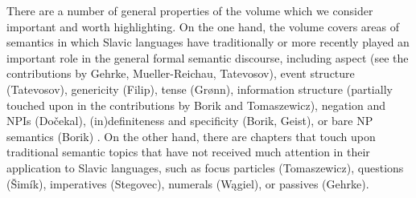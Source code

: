 \documentclass[output=paper,colorlinks,citecolor=brown]{langscibook}
\begin{document}
There are a number of general properties of the volume which we consider important and worth highlighting. On the one hand, the volume covers areas of semantics in which Slavic languages have traditionally or more recently played an important role in the general formal semantic discourse, including aspect (see the contributions by Gehrke, Mueller-Reichau, Tatevosov), event structure (Tatevosov), genericity (Filip), tense (Grønn), %
information structure (partially touched upon in the contributions by Borik and Tomaszewicz), %
negation and NPIs (Do\v{c}ekal), (in)definiteness and specificity (Borik, Geist), or bare NP semantics (Borik)%
. On the other hand, there are chapters that touch upon traditional semantic topics that have not received much attention in their application to Slavic languages, such as focus particles (Tomaszewicz), %
questions (\v{S}imík), imperatives (Stegovec), %
numerals (Wągiel), or passives (Gehrke).
\end{document}
